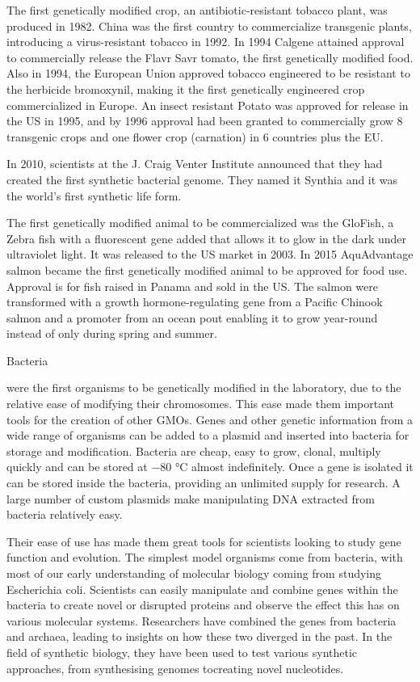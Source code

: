 The first genetically modified crop, an antibiotic-resistant tobacco plant, was produced in 1982. China was the first country to commercialize transgenic plants, introducing a virus-resistant tobacco in 1992. In 1994 Calgene attained approval to commercially release the Flavr Savr tomato, the first genetically modified food. Also in 1994, the European Union approved tobacco engineered to be resistant to the herbicide bromoxynil, making it the first genetically engineered crop commercialized in Europe. An insect resistant Potato was approved for release in the US in 1995, and by 1996 approval had been granted to commercially grow 8 transgenic crops and one flower crop (carnation) in 6 countries plus the EU.

In 2010, scientists at the J. Craig Venter Institute announced that they had created the first synthetic bacterial genome. They named it Synthia and it was the world's first synthetic life form.

The first genetically modified animal to be commercialized was the GloFish, a Zebra fish with a fluorescent gene added that allows it to glow in the dark under ultraviolet light. It was released to the US market in 2003. In 2015 AquAdvantage salmon became the first genetically modified animal to be approved for food use. Approval is for fish raised in Panama and sold in the US. The salmon were transformed with a growth hormone-regulating gene from a Pacific Chinook salmon and a promoter from an ocean pout enabling it to grow year-round instead of only during spring and summer.

Bacteria

were the first organisms to be genetically modified in the laboratory, due to the relative ease of modifying their chromosomes. This ease made them important tools for the creation of other GMOs. Genes and other genetic information from a wide range of organisms can be added to a plasmid and inserted into bacteria for storage and modification. Bacteria are cheap, easy to grow, clonal, multiply quickly and can be stored at −80 °C almost indefinitely. Once a gene is isolated it can be stored inside the bacteria, providing an unlimited supply for research. A large number of custom plasmids make manipulating DNA extracted from bacteria relatively easy.

Their ease of use has made them great tools for scientists looking to study gene function and evolution. The simplest model organisms come from bacteria, with most of our early understanding of molecular biology coming from studying Escherichia coli. Scientists can easily manipulate and combine genes within the bacteria to create novel or disrupted proteins and observe the effect this has on various molecular systems. Researchers have combined the genes from bacteria and archaea, leading to insights on how these two diverged in the past. In the field of synthetic biology, they have been used to test various synthetic approaches, from synthesising genomes tocreating novel nucleotides.

